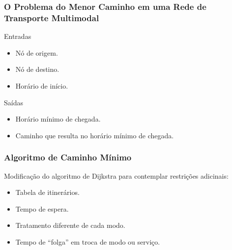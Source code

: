 \frame
{
\frametitle{O Problema do Menor Caminho em uma Rede de Transporte Multimodal}
\begin{exampleblock}{Entradas}
	\begin{itemize}
	\item Nó de origem.
	\item Nó de destino.
	\item Horário de início.
	\end{itemize}
\end{exampleblock}

\begin{alertblock}{Saídas}
	\begin{itemize}
	\item Horário mínimo de chegada.
	\item Caminho que resulta no horário mínimo de chegada.
	\end{itemize}
\end{alertblock}
}

\frame
{
\frametitle{Algoritmo de Caminho Mínimo}
Modificação do algoritmo de Dijkstra para contemplar restrições adicinais:
	\begin{itemize}
	\item Tabela de itinerários.
	\item Tempo de espera.
	\item Tratamento diferente de cada modo.
	\item Tempo de ``folga'' em troca de modo ou serviço.
	\end{itemize}
}

